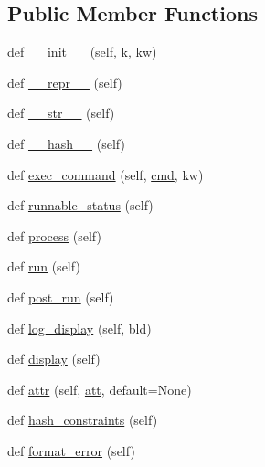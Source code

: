 \subsection*{Public Member Functions}
\begin{DoxyCompactItemize}
\item 
def \hyperlink{classwaflib_1_1_task_1_1_task_base_add6ae927b00bd1f14d5b87738dd53e70}{\+\_\+\+\_\+init\+\_\+\+\_\+} (self, \hyperlink{rfft2d_test_m_l_8m_adc468c70fb574ebd07287b38d0d0676d}{k}, kw)
\item 
def \hyperlink{classwaflib_1_1_task_1_1_task_base_a004a67fbb5d7e36d1a6ba48390e0d5f7}{\+\_\+\+\_\+repr\+\_\+\+\_\+} (self)
\item 
def \hyperlink{classwaflib_1_1_task_1_1_task_base_a07123f80c95b1d17a699064cd10d8885}{\+\_\+\+\_\+str\+\_\+\+\_\+} (self)
\item 
def \hyperlink{classwaflib_1_1_task_1_1_task_base_a5e02f89716bcd37b2490adc0861c4bdd}{\+\_\+\+\_\+hash\+\_\+\+\_\+} (self)
\item 
def \hyperlink{classwaflib_1_1_task_1_1_task_base_a6326ff82d67a2b629c8d78b95cb8fec6}{exec\+\_\+command} (self, \hyperlink{sndfile__play_8m_adfc5ba7e22f5e4a6221c12a70503bef3}{cmd}, kw)
\item 
def \hyperlink{classwaflib_1_1_task_1_1_task_base_a10c4597d9085bd1680f9b3eb28e23899}{runnable\+\_\+status} (self)
\item 
def \hyperlink{classwaflib_1_1_task_1_1_task_base_ae5e951a187c8d09c31960bbcf76fad25}{process} (self)
\item 
def \hyperlink{classwaflib_1_1_task_1_1_task_base_ae549bc1a80fd94cc94fd1e764c76895c}{run} (self)
\item 
def \hyperlink{classwaflib_1_1_task_1_1_task_base_a21b09d3f18df76e1d8b0719f321ea3bd}{post\+\_\+run} (self)
\item 
def \hyperlink{classwaflib_1_1_task_1_1_task_base_adf380fd031fc987f4dcd54e1f70420a7}{log\+\_\+display} (self, bld)
\item 
def \hyperlink{classwaflib_1_1_task_1_1_task_base_a838316cf55ac50fab2ae0e8771917e74}{display} (self)
\item 
def \hyperlink{classwaflib_1_1_task_1_1_task_base_a8ead2ec09545f4e9e27d6b40f9f80eaa}{attr} (self, \hyperlink{filters_8h_a6cbe32dd86cefd1a8b182b3ee652e9bf}{att}, default=None)
\item 
def \hyperlink{classwaflib_1_1_task_1_1_task_base_ad4f2583a59ff62565735490154826033}{hash\+\_\+constraints} (self)
\item 
def \hyperlink{classwaflib_1_1_task_1_1_task_base_a321e667402035aa56626ee6f7b3b8223}{format\+\_\+error} (self)

\end{DoxyCompactItemize}
